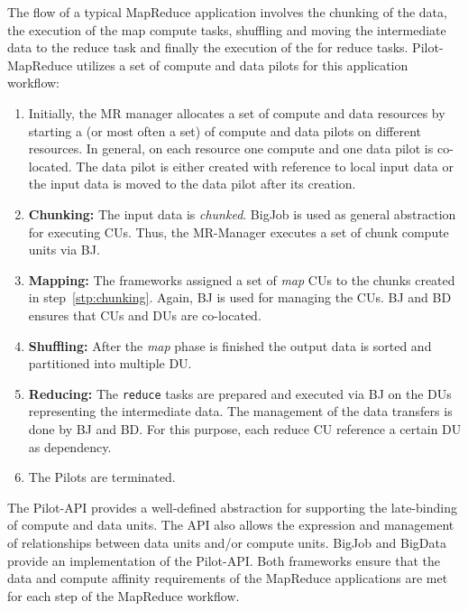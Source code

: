 \documentclass{acm_proc_article-sp}
\newcommand{\pilots}{Pilots\xspace}
\begin{document}
The flow of a typical MapReduce application involves the chunking of the data,
the execution of the map compute tasks, shuffling and moving the intermediate
data to the reduce task and finally the execution of the for reduce tasks.
Pilot-MapReduce utilizes a set of compute and data pilots for this application
workflow:
\begin{enumerate}
	\item Initially, the MR manager allocates a set of compute and data 
	resources by starting a (or most often a set) of compute and data pilots 
	on different resources. In general, on each resource one compute 
	and one data pilot is co-located. The data pilot is either created with 
	reference to local input data or the input data is moved to the data pilot 
	after its creation. 

	\item \textbf{Chunking:} The input data is {\it chunked}. BigJob is used 
	as general 
	abstraction for executing CUs. Thus, the MR-Manager executes a set of 
	chunk compute units via BJ. \label{stp:chunking}
	
	\item \textbf{Mapping:} The frameworks assigned a set of {\it map} CUs to 
	the chunks created 
	in step~\ref{stp:chunking}. Again, BJ is used for managing the CUs. BJ and 
	BD ensures that CUs and DUs are co-located.
	
	\item \textbf{Shuffling:} After the {\it map} phase is finished the output 
	data is sorted and partitioned into multiple DU.
	
	\item \textbf{Reducing:} The \texttt{reduce} tasks are prepared and 
	executed via BJ on the DUs representing the intermediate data. The 
	management of the data transfers is done by BJ and BD. For this purpose, 
	each reduce CU reference a certain DU as dependency.
	
	\item The \pilots are terminated.

\end{enumerate}

The Pilot-API provides a well-defined abstraction for supporting the
late-binding of compute and data units. The API also allows the expression and
management of relationships between data units and/or compute units. BigJob
and BigData provide an implementation of the Pilot-API. Both frameworks ensure
that the data and compute affinity requirements of the MapReduce applications
are met for each step of the MapReduce workflow.
\end{document}
